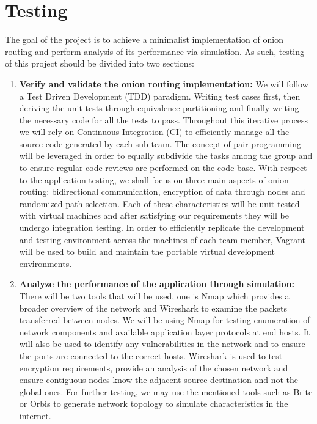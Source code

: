 \documentclass[10pt]{article}
\begin{document}
\section*{Testing}
The goal of the project is to achieve a minimalist implementation of onion
routing and perform analysis of its performance via simulation. As such,
testing of this project should be divided into two sections:
\begin{enumerate}
	\item \textbf{Verify and validate the onion routing implementation:} We
		will follow a Test Driven Development (TDD) paradigm. Writing test
		cases first, then deriving the unit tests through equivalence
		partitioning and finally writing the necessary code for all the tests
		to pass. Throughout this iterative process we will rely on Continuous
		Integration (CI) to efficiently manage all the source code generated by
		each sub-team. The concept of pair programming will be leveraged in
		order to equally subdivide the tasks among the group and to ensure
		regular code reviews are performed on the code base. With respect to
		the application testing, we shall focus on three main aspects of onion
		routing: \underline{bidirectional communication}, \underline{encryption
		of data through nodes} and \underline{randomized path selection}. Each
		of these characteristics will be unit tested with virtual machines and
		after satisfying our requirements they will be undergo integration
		testing. In order to efficiently replicate the development and testing
		environment across the machines of each team member, Vagrant will be
		used to build and maintain the portable virtual development
		environments.
	\item \textbf{Analyze the performance of the application through
		simulation:} There will be two tools that will be used, one is Nmap
		which provides a broader overview of the network and Wireshark to
		examine the packets transferred between nodes. We will be using Nmap
		for testing enumeration of network components and available application
		layer protocols at end hosts. It will also be used to identify any
		vulnerabilities in the network and to ensure the ports are connected to
		the correct hosts. Wireshark is used to test encryption requirements,
		provide an analysis of the chosen network and ensure contiguous nodes
		know the adjacent source destination and not the global ones. For
		further testing, we may use the mentioned tools such as Brite or Orbis
		to generate network topology to simulate characteristics in the
		internet.


\end{enumerate}
\end{document}
